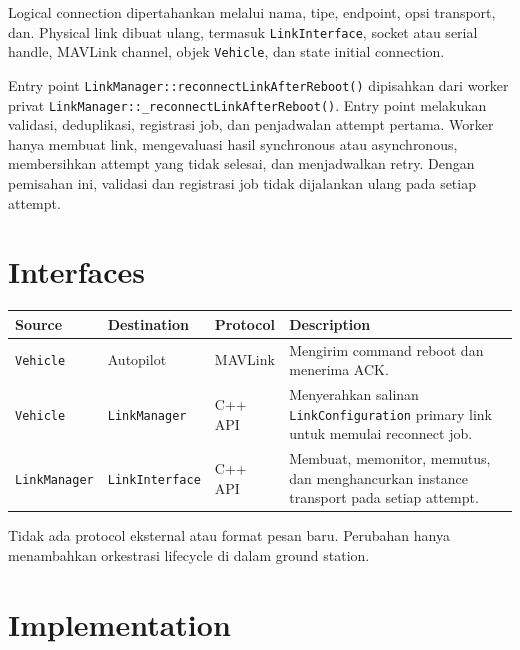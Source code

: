 \documentclass[11pt,a4paper]{article}
\begin{document}
Logical connection dipertahankan melalui nama, tipe, endpoint, opsi transport, dan. Physical link dibuat ulang, termasuk
\texttt{LinkInterface}, socket atau serial handle, MAVLink channel, objek
\texttt{Vehicle}, dan state initial connection.

Entry point \nolinkurl{LinkManager::reconnectLinkAfterReboot()} dipisahkan dari
worker privat \nolinkurl{LinkManager::_reconnectLinkAfterReboot()}. Entry point melakukan
validasi, deduplikasi, registrasi job, dan penjadwalan attempt pertama. Worker hanya
membuat link, mengevaluasi hasil synchronous atau asynchronous, membersihkan attempt
yang tidak selesai, dan menjadwalkan retry. Dengan pemisahan ini, validasi dan
registrasi job tidak dijalankan ulang pada setiap attempt.

\section{Interfaces}

\begin{table}[H]
\centering
\begin{tabularx}{\textwidth}{l l l Y}
\toprule
\textbf{Source} &
\textbf{Destination} &
\textbf{Protocol} &
\textbf{Description} \\
\midrule
\texttt{Vehicle} &
Autopilot &
MAVLink &
Mengirim command reboot dan menerima ACK. \\

\texttt{Vehicle} &
\texttt{LinkManager} &
C++ API &
Menyerahkan salinan \texttt{LinkConfiguration} primary link untuk memulai reconnect job. \\

\texttt{LinkManager} &
\texttt{LinkInterface} &
C++ API &
Membuat, memonitor, memutus, dan menghancurkan instance transport pada setiap
attempt. \\

\bottomrule
\end{tabularx}
\end{table}

Tidak ada protocol eksternal atau format pesan baru. Perubahan hanya menambahkan
orkestrasi lifecycle di dalam ground station.

\section{Implementation}
\end{document}
